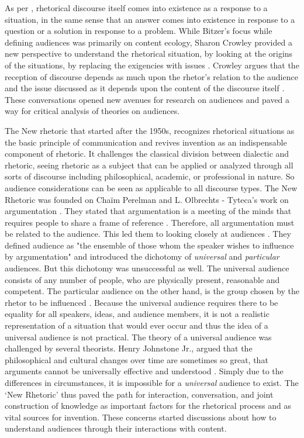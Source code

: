 As per \textcite{bitzer1968rhetorical}, rhetorical discourse itself comes into existence as a response to a situation, in the same sense that an answer comes into existence in response to a question or a solution in response to a problem. While Bitzer’s focus while defining audiences was primarily on content ecology, Sharon Crowley \cite{crowley1999ancient} provided a new perspective to understand the rhetorical situation, by looking at the origins of the situations, by replacing the exigencies with issues \cite{bitzer1968rhetorical}. Crowley argues that the reception of discourse depends as much upon the rhetor's relation to the audience and the issue discussed as it depends upon the content of the discourse itself \cite{crowley1999ancient}.  These conversations opened new avenues for research on audiences and paved a way for critical analysis of theories on audiences.

The New rhetoric that started after the 1950s, recognizes rhetorical situations as the basic principle of communication and revives invention as an indispensable component of rhetoric. It challenges the classical division between dialectic and rhetoric, seeing rhetoric as a subject that can be applied or analyzed through all sorts of discourse including philosophical, academic, or professional in nature. So audience considerations can be seen as applicable to all discourse types. The New Rhetoric was founded on Chaïm Perelman and L. Olbrechts - Tyteca’s work on argumentation \cite{long1983role}. They stated that argumentation is a meeting of the minds that requires people to share a frame of reference . Therefore, all argumentation must be related to the audience. This led them to looking closely at audiences \cite{long1983role}. They defined audience as "the ensemble of those whom the speaker wishes to influence by argumentation" and introduced the dichotomy of \textit{universal} and \textit{particular} audiences. But this dichotomy was unsuccessful as well. The universal audience consists of any number of people, who are physically present, reasonable and competent. The particular audience on the other hand, is the group chosen by the rhetor to be influenced \cite{perelman1969new}. Because the universal audience requires there to be equality for all speakers, ideas, and audience members, it is not a realistic representation of a situation that would ever occur and thus the idea of a universal audience is not practical. The theory of a universal audience was challenged by several theorists. Henry Johnstone Jr., argued that the philosophical and cultural changes over time are sometimes so great, that arguments cannot be universally effective and understood \cite{hauser2007philosophy}. Simply due to the differences in circumstances, it is impossible for a \textit{universal} audience to exist. The ‘New Rhetoric’ thus paved the path for interaction, conversation, and joint construction of knowledge as important factors for the rhetorical process and as vital sources for invention. These concerns started discussions about how to understand audiences through their interactions with content.

